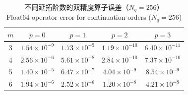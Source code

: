 \begin{table}[H]
\centering
\caption{不同延拓阶数的双精度算子误差（$N_q=256$）\\Float64 operator error for continuation orders ($N_q=256$)}
\label{tab:p-ablation}
\small
\begin{tabular}{ccccc}
\toprule
$m$ & $p=0$ & $p=1$ & $p=2$ & $p=3$\\
\midrule
3 & $1.54\times10^{-9}$ & $1.73\times10^{-9}$ & $1.19\times10^{-10}$ & $6.40\times10^{-11}$\\
4 & $2.56\times10^{-6}$ & $5.61\times10^{-8}$ & $2.84\times10^{-10}$ & $7.37\times10^{-10}$\\
5 & $1.40\times10^{-5}$ & $6.47\times10^{-7}$ & $4.04\times10^{-9}$ & $8.54\times10^{-9}$\\
6 & $1.94\times10^{-6}$ & $2.52\times10^{-6}$ & $1.20\times10^{-8}$ & $4.21\times10^{-8}$\\
\bottomrule
\end{tabular}
\end{table}
